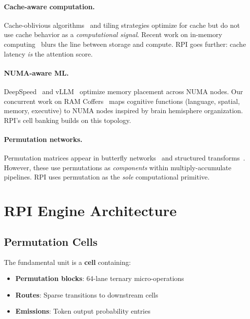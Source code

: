 \documentclass[10pt,twocolumn]{article}
\begin{document}
\paragraph{Cache-aware computation.} Cache-oblivious algorithms~\cite{frigo1999cache} and tiling strategies optimize for cache but do not use cache behavior as a \emph{computational signal}. Recent work on in-memory computing~\cite{sebastian2020memory} blurs the line between storage and compute. RPI goes further: cache latency \emph{is} the attention score.

\paragraph{NUMA-aware ML.} DeepSpeed~\cite{rasley2020deepspeed} and vLLM~\cite{kwon2023efficient} optimize memory placement across NUMA nodes. Our concurrent work on RAM Coffers~\cite{boudreaux2025coffers} maps cognitive functions (language, spatial, memory, executive) to NUMA nodes inspired by brain hemisphere organization. RPI's cell banking builds on this topology.

\paragraph{Permutation networks.} Permutation matrices appear in butterfly networks~\cite{dao2019learning} and structured transforms~\cite{chen2019pixelated}. However, these use permutations as \emph{components} within multiply-accumulate pipelines. RPI uses permutation as the \emph{sole} computational primitive.

\section{RPI Engine Architecture}
\label{sec:engine}

\subsection{Permutation Cells}

The fundamental unit is a \textbf{cell} containing:
\begin{itemize}
\item \textbf{Permutation blocks}: 64-lane ternary micro-operations
\item \textbf{Routes}: Sparse transitions to downstream cells
\item \textbf{Emissions}: Token output probability entries
\end{itemize}
\end{document}
